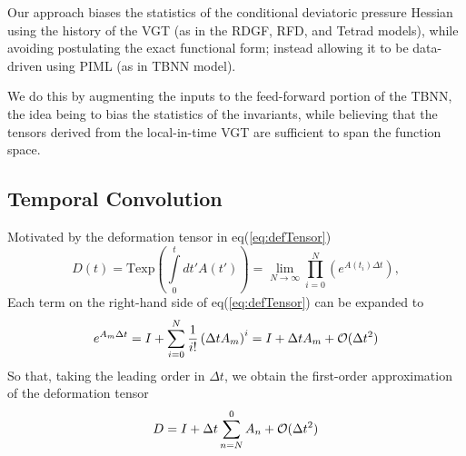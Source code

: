 Our approach biases the statistics of the conditional deviatoric pressure Hessian using the history of the VGT (as in the RDGF, RFD, and Tetrad models), while avoiding postulating the exact functional form; instead allowing it to be data-driven using PIML (as in TBNN model).

We do this by augmenting the inputs to the feed-forward portion of the TBNN, the idea being to bias the statistics of the invariants, while believing that the tensors derived from the local-in-time VGT are sufficient to span the function space.

    
    
\subsection{Temporal Convolution}
Motivated by the deformation tensor in eq(\ref{eq:defTensor})
\begin{equation}
  D(t) = \text{Texp}\left(\int\limits_0^t dt' A(t')\right) = \lim_{N\to \infty} \prod_{i = 0}^N \left( e^{A(t_i)\Delta t} \right),
\end{equation}
Each term on the right-hand side of eq(\ref{eq:defTensor}) can be expanded to
\begin{equation}
  e^{A_m \Delta t} = I + \sum_{i=0}^N \frac{1}{i!} \left( \Delta t A_m \right)^i = I + \Delta t A_m+ \mathcal{O}(\Delta t^2)
\end{equation}
So that, taking the leading order in $\Delta t$, we obtain the first-order approximation of the deformation tensor
\begin{equation}
  D = I + \Delta t \sum_{n=N}^0 A_n + \mathcal{O}(\Delta t^2)
\end{equation}


